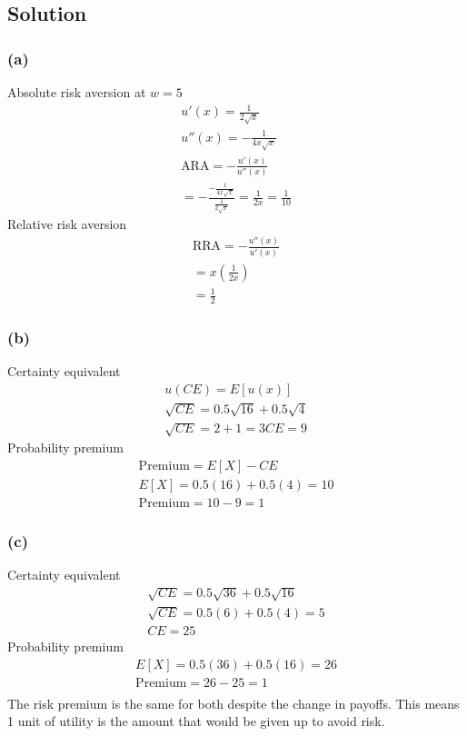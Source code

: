 \documentclass[10pt, a4paper]{article}
\begin{document}
    \subsection*{Solution}
      \subsubsection*{(a)}
        Absolute risk aversion at $w=5$
          \begin{gather*}
            u'(x) = \frac{1}{2\sqrt{x}}\\
            u''(x) = -\frac{1}{4x\sqrt{x}}\\
            \text{ARA} = -\frac{u'(x)}{u''(x)} \\
            = -\frac{-\frac{1}{4x\sqrt{x}}}{\frac{1}{2\sqrt{x}}}
            = \frac{1}{2x}
            = \frac{1}{10}
          \end{gather*}
        Relative risk aversion
          \begin{gather*}
            \text{RRA} = -\frac{u''(x)}{u'(x)}\\
            = x(\frac{1}{2x})\\
            =\frac{1}{2}
          \end{gather*}
      \subsubsection*{(b)}
        Certainty equivalent
          \begin{gather*}
            u(CE) = E[u(x)]\\
            \sqrt{CE} = 0.5\sqrt{16} + 0.5\sqrt{4}\\
            \sqrt{CE} = 2 + 1 = 3
            CE = 9
          \end{gather*}
        Probability premium
          \begin{gather*}
            \text{Premium} = E[X] - CE \\
            E[X] = 0.5(16) + 0.5(4) = 10 \\
            \text{Premium} = 10 - 9 = 1
          \end{gather*}
      \subsubsection*{(c)}
        Certainty equivalent
          \begin{gather*}
            \sqrt{CE} = 0.5\sqrt{36} + 0.5\sqrt{16} \\
            \sqrt{CE} = 0.5(6) + 0.5(4) = 5 \\
            CE = 25
          \end{gather*}
        Probability premium
          \begin{gather*}
            E[X] = 0.5(36) + 0.5(16) = 26 \\
            \text{Premium} = 26-25 = 1 \\
          \end{gather*}
        The risk premium is the same for both despite the change in payoffs. This means 1 unit of utility is the amount that would be given up to avoid risk.
\end{document}
